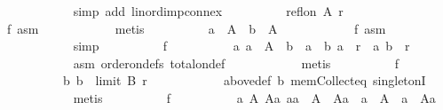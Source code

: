 \begin{isabellebody}
\ \ \ \ \ \ \ \ \ \ \isamarkupfalse%
\ {\isacharparenleft}{\kern0pt}simp\ add{\isacharcolon}{\kern0pt}\ lin{\isacharunderscore}{\kern0pt}ord{\isacharunderscore}{\kern0pt}imp{\isacharunderscore}{\kern0pt}connex{\isacharparenright}{\kern0pt}\isanewline
\ \ \ \ \ \ \ \ \isamarkupfalse%
\ {\isachardoublequoteopen}refl{\isacharunderscore}{\kern0pt}on\ A\ r{\isachardoublequoteclose}\isanewline
\ \ \ \ \ \ \ \ \ \ \isamarkupfalse%
\ f{}\ asm\isanewline
\ \ \ \ \ \ \ \ \ \ \isamarkupfalse%
\ metis\isanewline
\ \ \ \ \ \ \ \ \isamarkupfalse%
\ {\isachardoublequoteopen}a\ {\isasymin}\ A\ {\isasymand}\ b\ {\isasymin}\ A{\isachardoublequoteclose}\isanewline
\ \ \ \ \ \ \ \ \ \ \isamarkupfalse%
\ f{}\ asm{}\isanewline
\ \ \ \ \ \ \ \ \ \ \isamarkupfalse%
\ simp\isanewline
\ \ \ \ \ \ \ \ \isamarkupfalse%
\ f{}{\isacharcolon}{\kern0pt}\isanewline
\ \ \ \ \ \ \ \ \ \ {\isachardoublequoteopen}{\isasymforall}a{\isachardot}{\kern0pt}\ a\ {\isasymnotin}\ A\ {\isasymor}\ b\ {\isacharequal}{\kern0pt}\ a\ {\isasymor}\ {\isacharparenleft}{\kern0pt}b{\isacharcomma}{\kern0pt}\ a{\isacharparenright}{\kern0pt}\ {\isasymin}\ r\ {\isasymor}\ {\isacharparenleft}{\kern0pt}a{\isacharcomma}{\kern0pt}\ b{\isacharparenright}{\kern0pt}\ {\isasymin}\ r{\isachardoublequoteclose}\isanewline
\ \ \ \ \ \ \ \ \ \ \isamarkupfalse%
\ asm\ order{\isacharunderscore}{\kern0pt}on{\isacharunderscore}{\kern0pt}defs{\isacharparenleft}{\kern0pt}{}{\isacharparenright}{\kern0pt}\ total{\isacharunderscore}{\kern0pt}on{\isacharunderscore}{\kern0pt}def\isanewline
\ \ \ \ \ \ \ \ \ \ \isamarkupfalse%
\ metis\isanewline
\ \ \ \ \ \ \ \ \isamarkupfalse%
\ f{}{\isacharcolon}{\kern0pt}\isanewline
\ \ \ \ \ \ \ \ \ \ {\isachardoublequoteopen}{\isacharparenleft}{\kern0pt}b{\isacharcomma}{\kern0pt}\ b{\isacharparenright}{\kern0pt}\ {\isasymin}\ limit\ B\ r{\isachardoublequoteclose}\isanewline
\ \ \ \ \ \ \ \ \ \ \isamarkupfalse%
\ above{\isacharunderscore}{\kern0pt}def\ b\ mem{\isacharunderscore}{\kern0pt}Collect{\isacharunderscore}{\kern0pt}eq\ singletonI\isanewline
\ \ \ \ \ \ \ \ \ \ \isamarkupfalse%
\ metis\isanewline
\ \ \ \ \ \ \ \ \isamarkupfalse%
\ f{}{\isacharcolon}{\kern0pt}\isanewline
\ \ \ \ \ \ \ \ \ \ {\isachardoublequoteopen}{\isasymforall}a\ A\ Aa{\isachardot}{\kern0pt}\ {\isacharparenleft}{\kern0pt}a{\isacharcolon}{\kern0pt}{\isacharcolon}{\kern0pt}{\isacharprime}{\kern0pt}a{\isacharparenright}{\kern0pt}\ {\isasymnotin}\ A\ {\isacharminus}{\kern0pt}\ Aa\ {\isasymor}\ a\ {\isasymin}\ A\ {\isasymand}\ a\ {\isasymnotin}\ Aa{\isachardoublequoteclose}\isanewline

\end{isabellebody}

